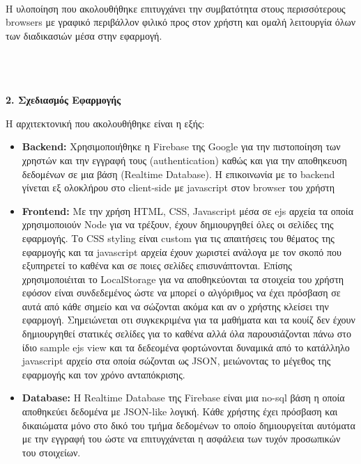 \documentclass[12pt]{article}
\newcommand{\en}[1]{\foreignlanguage{english}{#1}}
\begin{document}
\\
\par
Η υλοποίηση που ακολουθήθηκε επιτυγχάνει την συμβατότητα στους περισσότερους \en{browsers} με γραφικό περιβάλλον φιλικό προς στον χρήστη και ομαλή λειτουργία όλων των διαδικασιών μέσα στην εφαρμογή.
\\ \\ \\ \\
\par
\noindent
\large \textbf{2. Σχεδιασμός Εφαρμογής}
\\
\par
Η αρχιτεκτονική που ακολουθήθηκε είναι η εξής:
\begin{itemize}
    \item \textbf{\en{Backend}:} Χρησιμοποιήθηκε η \en{Firebase} της \en{Google} για την πιστοποίηση των χρηστών και την εγγραφή τους (\en{authentication}) καθώς και για την αποθηκευση δεδομένων σε μια βάση (\en{Realtime Database}). Η επικοινωνία με το \en{backend} γίνεται εξ ολοκλήρου στο \en{client-side} με \en{javascript} στον \en{browser} του χρήστη
    \item \textbf{\en{Frontend}:} Με την χρήση \en{HTML}, \en{CSS}, \en{Javascript} μέσα σε \en{ejs} αρχεία τα οποία χρησιμοποιούν \en{Node} για να τρέξουν, έχουν δημιουργηθεί όλες οι σελίδες της εφαρμογής. Το \en{CSS styling} είναι \en{custom} για τις απαιτήσεις του θέματος της εφαρμογής και τα \en{javascript} αρχεία έχουν χωριστεί ανάλογα με τον σκοπό που εξυπηρετεί το καθένα και σε ποιες σελίδες επισυνάπτονται. Επίσης χρησιμοποιέιται το \en{LocalStorage} για να αποθηκεύονται τα στοιχεία του χρήστη εφόσον είναι συνδεδεμένος ώστε να μπορεί ο αλγόριθμος να έχει πρόσβαση σε αυτά από κάθε σημείο και να σώζονται ακόμα και αν ο χρήστης κλείσει την εφαρμογή. Σημειώνεται οτι συγκεκριμένα για τα μαθήματα και τα κουίζ δεν έχουν δημιουργηθεί στατικές σελίδες για το καθένα αλλά όλα παρουσιάζονται πάνω στο ίδιο \en{sample ejs view} και τα δεδεομένα φορτώνονται δυναμικά από το κατάλληλο \en{javascript} αρχείο στα οποία σώζονται ως \en{JSON}, μειώνοντας το μέγεθος της εφαρμογής και τον χρόνο ανταπόκρισης.
    \item \textbf{\en{Database}:} Η \en{Realtime Database} της \en{Firebase} είναι μια \en{no-sql} βάση η οποία αποθηκεύει δεδομένα με \en{JSON-like} λογική. Κάθε χρήστης έχει πρόσβαση και δικαιώματα μόνο στο δικό του τμήμα δεδομένων το οποίο δημιουργείται αυτόματα με την εγγραφή του ώστε να επιτυγχάνεται η ασφάλεια των τυχόν προσωπικών του στοιχείων.
    \end{itemize}
\end{document}

